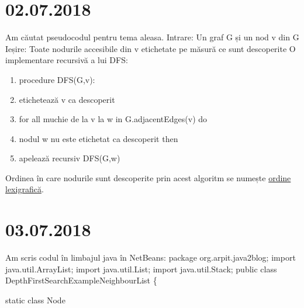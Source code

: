 \documentclass{report}
\begin{document}
\chapter{02.07.2018}
Am căutat pseudocodul pentru tema aleasa.\newline
\hspace*{0.5cm}Intrare: Un graf G și un nod v din G\newline
\hspace*{0.5cm}Ieșire: Toate nodurile accesibile din v etichetate pe măsură ce sunt descoperite\newline
\hspace*{0.5cm}O implementare recursivă a lui DFS:\newline
\begin{enumerate}
\item procedure DFS(G,v):
\item  etichetează v ca descoperit
\item  for all muchie de la v la w in G.adjacentEdges(v) do
\item    \hspace*{1cm} nodul w nu este etichetat ca descoperit then
\item     \hspace{1cm}apelează recursiv DFS(G,w)
\end{enumerate}
\hspace*{0.5cm}Ordinea în care nodurile sunt descoperite prin acest algoritm se numește \underline{ordine lexigrafică}.
\chapter{03.07.2018}
Am scris codul în limbajul java în NetBeans:
\newline
package org.arpit.java2blog;\newline
import java.util.ArrayList;\newline
import java.util.List;\newline
import java.util.Stack;\newline
\newline
public class DepthFirstSearchExampleNeighbourList\newline
\{
 
	static class Node
    
\end{document}
